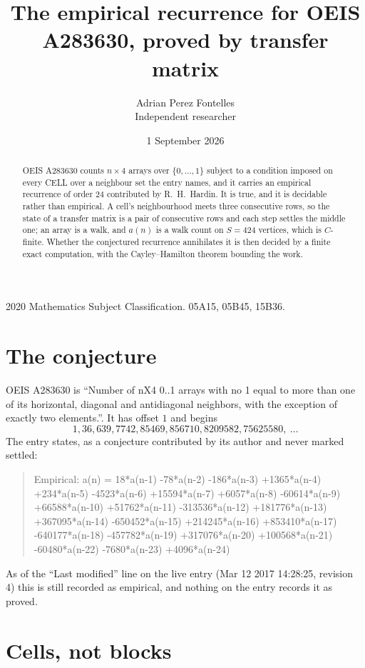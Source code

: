 \documentclass[11pt,a4paper]{article}
\title{The empirical recurrence for OEIS A283630, proved by transfer matrix}
\author{Adrian Perez Fontelles\\ \small Independent researcher}
\date{1 September 2026}
\theoremstyle{plain}
\theoremstyle{definition}
\begin{document}
\maketitle

\begin{abstract}
OEIS A283630 counts $n\times4$ arrays over $\{0,\dots,1\}$ subject to a condition imposed on
every CELL over a neighbour set the entry names, and it carries an empirical recurrence of
order $24$ contributed by R.~H.~Hardin. It is true, and it is decidable rather than
empirical. A cell's neighbourhood meets three consecutive rows, so the state of a transfer
matrix is a pair of consecutive rows and each step settles the middle one; an array is a
walk, and $a(n)$ is a walk count on $S=424$ vertices, which is $C$-finite. Whether the
conjectured recurrence annihilates it is then decided by a finite exact computation, with the
Cayley--Hamilton theorem bounding the work.
\end{abstract}

\noindent\small 2020 Mathematics Subject Classification. 05A15, 05B45, 15B36.\normalsize

\section{The conjecture}

OEIS A283630 is ``Number of nX4 0..1 arrays with no 1 equal to more than one of its horizontal, diagonal and antidiagonal neighbors, with the exception of exactly two elements.''. It has offset $1$ and begins
\[
1, 36, 639, 7742, 85469, 856710, 8209582, 75625580,\ \dots
\]
The entry states, as a conjecture contributed by its author and never marked settled:
\begin{quote}
Empirical: a(n) = 18*a(n-1) -78*a(n-2) -186*a(n-3) +1365*a(n-4) +234*a(n-5) -4523*a(n-6) +15594*a(n-7) +6057*a(n-8) -60614*a(n-9) +66588*a(n-10) +51762*a(n-11) -313536*a(n-12) +181776*a(n-13) +367095*a(n-14) -650452*a(n-15) +214245*a(n-16) +853410*a(n-17) -640177*a(n-18) -457782*a(n-19) +317076*a(n-20) +100568*a(n-21) -60480*a(n-22) -7680*a(n-23) +4096*a(n-24)
\end{quote}
As of the ``Last modified'' line on the live entry (Mar 12 2017 14:28:25, revision 4) this is still
recorded as empirical, and nothing on the entry records it as proved.

\section{Cells, not blocks}
\end{document}

